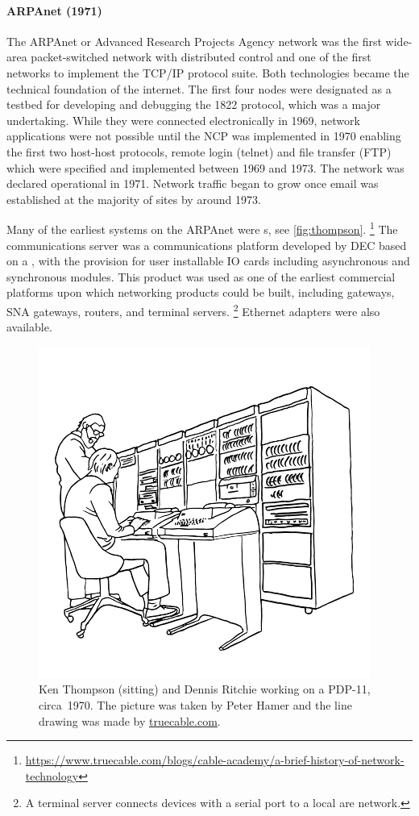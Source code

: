 {\paragraph{ARPAnet (1971)}
The ARPAnet or Advanced Research Projects Agency network was the first wide-area packet-switched network with distributed control and one of the first networks to implement the \acs{TCP}/\acs{IP} protocol suite.
Both technologies became the technical foundation of the internet.
The first four nodes were designated as a testbed for developing and debugging the 1822 protocol, which was a major undertaking.
While they were connected electronically in 1969, network applications were not possible until the \gls{NCP} was implemented in 1970 enabling the first two host-host protocols, remote login (telnet) and file transfer (\acs{FTP}) which were specified and implemented between 1969 and 1973.
The network was declared operational in 1971.
Network traffic began to grow once email was established at the majority of sites by around 1973.

Many of the earliest systems on the ARPAnet were s, see \vref{fig:thompson}.%
\footnote{\href{https://www.truecable.com/blogs/cable-academy/a-brief-history-of-network-technology}{https://www.truecable.com/blogs/cable-academy/a-brief-history-of-network-technology}}
The  communications server was a communications platform developed by \gls{DEC} based on a , with the provision for user installable \gls{IO} cards including asynchronous and synchronous modules.
This product was used as one of the earliest commercial platforms upon which networking products could be built, including  gateways, \gls{SNA} gateways, routers, and terminal servers.%
\footnote{A terminal server connects devices with a serial port to a local are network.}
Ethernet adapters were also available.

\begin{figure}
\centering
\includegraphics[width=.5\textwidth]{images/thompson.png}
\caption{Ken Thompson (sitting) and Dennis Ritchie working on a PDP-11, circa~1970. The picture was taken by Peter Hamer and the line drawing was made by \href{https://www.truecable.com/blogs/cable-academy/a-brief-history-of-network-technology}{truecable.com}.}
\label{fig:thompson}
\end{figure}

}
